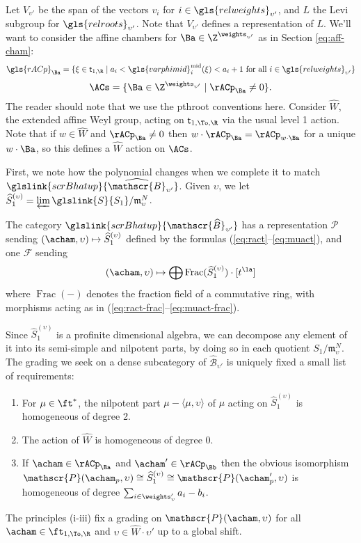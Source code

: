 Let $V_{\upsilon'}$ be the span of the vectors $v_i$
for $i\in\gls{relweights}_{\upsilon'}$, and $L$ the Levi subgroup for
$\gls{relroots}_{\upsilon'}$.  Note that $V_{\upsilon'}$ defines a
representation of $L$.  
We'll want to consider the affine chambers for $\Ba\in \Z^{\weights_{\upsilon'}}$ as in Section \ref{eq:aff-cham}: 
\[\gls{rACp}_{\Ba}=\{\xi \in \mathsf{t}_{1,\R}\mid a_i<\gls{varphimid}_i^{\operatorname{mid}}(\xi)<a_i+1\text{
  for all $i\in \gls{relweights}_{\upsilon'}$}\}\label{eq:r-aff-cham}\]  
\[\ACs=\{\Ba\in \Z^{\weights_{\upsilon'}}\mid \rACp_{\Ba}\neq 0\}.\] 
  The reader should note that we use the \gls{pthroot} conventions here.
Consider $\widehat{W}$, the extended affine Weyl group, acting on
$\mathsf{t}_{1,\To,\R}$ via the usual level 1 action. Note that if $w\in
\widehat{W}$ and $\rACp_{\Ba}\neq 0$ then $w\cdot
\rACp_{\Ba}=\rACp_{w\cdot \Ba}$ for a unique $w\cdot \Ba$, so this
defines a $\widehat{W}$ action on $\ACs$.

First, we note how the polynomial changes when we complete it to match
$\glslink{scrBhatup}{\widehat{\mathscr{B}}_{\upsilon'}}$.  
Given $\upsilon$, we
let $\widehat{S}^{(\upsilon)}_1=\varprojlim
\glslink{S}{S_1}/\mathfrak{m}_\upsilon^N$.

\begin{proposition}\label{prop:hat-rep}
  The category $\glslink{scrBhatup}{\mathscr{\widehat{B}}_{\upsilon'}}$ has a 
  representation $\mathscr{P}$ sending $(\acham, \upsilon) \mapsto
  \widehat{S}^{(\upsilon)}_1$ defined by the formulas (\ref{eq:ract}--\ref{eq:muact}), and one $\mathscr{F}$ sending 
  \[(\acham, \upsilon)\mapsto \bigoplus \operatorname{Frac}( \widehat{S}^{(\upsilon)}_1)\cdot [t^\la] \]
  where $\operatorname{Frac}(-)$ denotes the fraction field of a commutative ring, with morphisms acting as in (\ref{eq:ract-frac}--\ref{eq:muact-frac}).
\end{proposition}
Since $\widehat{S}^{(\upsilon)}_1$ is a profinite dimensional algebra,
we can decompose any element of it into its semi-simple and nilpotent
parts, by doing so in each quotient $S_1/\mathfrak{m}_\upsilon^N$.
The grading we seek on a dense subcategory of  $\widehat{\mathscr{B}}_{\upsilon'}$ is uniquely
fixed a small list of  requirements:
\begin{enumerate}[label=(\roman*)]
\item For $\mu \in \ft^*$, the nilpotent part $\mu-\langle\mu,\upsilon\rangle$ of $\mu$
  acting on $\widehat{S}^{(\upsilon)}_1$ is homogeneous of degree 2.
\item The action of $\widehat{W}$ is homogeneous of degree 0.
\item If $\acham\in \rACp_{\Ba}$ and $\acham'\in \rACp_{\Bb}$ then the
  obvious isomorphism   $\mathscr{P}(\acham_p,\upsilon)\cong \widehat{S}^{(\upsilon)}_1\cong \mathscr{P}(\acham'_p,\upsilon)$
is homogeneous of degree $\sum_{i\in \weights_\upsilon'} a_i-b_i$.
\end{enumerate}
The principles (i-iii) fix a grading on $\mathscr{P}(\acham,\upsilon)$
for all $\acham\in \ft_{1,\To,\R}$ and $\upsilon\in \hat{W}\cdot
\upsilon'$ up to a global shift. 

